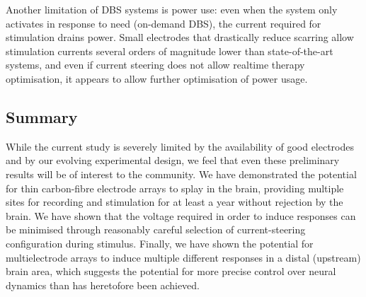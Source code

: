 \documentclass[10pt,letterpaper]{article}
\begin{document}
Another limitation of DBS systems is power use: even when the system
only activates in response to need (on-demand DBS), the current
required for stimulation drains power.  Small
electrodes that drastically reduce scarring allow stimulation currents
several orders of magnitude lower than state-of-the-art systems, and
even if current steering does not allow realtime therapy optimisation,
it appears to allow further optimisation of power usage.

\subsection{Summary}

While the current study is severely limited by the availability of
good electrodes and by our evolving experimental design,
we feel that even these preliminary results will be of interest to the community. We have
demonstrated the potential for thin carbon-fibre electrode arrays to
splay in the brain, providing
multiple sites for recording and stimulation for at least a year
without rejection by the brain. We have shown that the voltage
required in order to induce responses can be minimised through
reasonably careful selection of current-steering configuration during
stimulus. Finally, we have shown the potential for multielectrode
arrays to induce multiple different responses in a distal (upstream)
brain area, which suggests the potential for more precise control over
neural dynamics than has heretofore been achieved.



\end{document}
